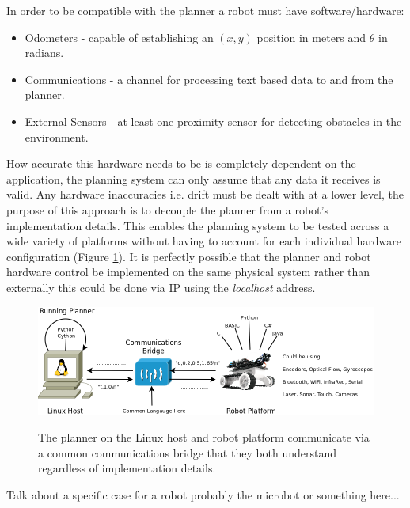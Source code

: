 \noindent
In order to be compatible with the planner a robot must have software/hardware:

\begin{itemize}
\item Odometers - capable of establishing an $(x, y)$ position in meters and $\theta$ in radians.
\item Communications - a channel for processing text based data to and from the planner.
\item External Sensors - at least one proximity sensor for detecting obstacles in the environment.
\end{itemize}

\newpage

\noindent
How accurate this hardware needs to be is completely dependent on the application, the planning system can only assume that any data it receives is valid. Any hardware inaccuracies i.e. drift must be dealt with at a lower level, the purpose of this approach is to decouple the planner from a robot's implementation details. This enables the planning system to be tested across a wide variety of platforms without having to account for each individual hardware configuration (Figure \ref{Figure: Hardware Agent Specification.}). It is perfectly possible that the planner and robot hardware control be implemented on the same physical system rather than externally this could be done via IP using the \textit{localhost} address.

\begin{figure}[htbp]

\center \includegraphics[width=400pt]{illustrations/hardware_agent_specification}\\
\caption{The planner on the Linux host and robot platform communicate via a common communications bridge that they both understand regardless of implementation details.} 
\label{Figure: Hardware Agent Specification.}

\end{figure}

\noindent
Talk about a specific case for a robot probably the microbot or something here...


